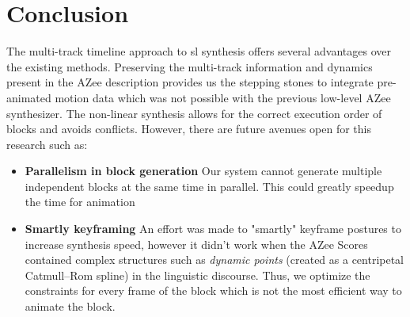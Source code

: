 \documentclass[../../main.tex]{subfiles}
\begin{document}
\section{Conclusion}
\label{ch:multi_track:conclusion}

The multi-track timeline approach to \gls{sl} synthesis offers several advantages over the existing methods. Preserving the multi-track information and dynamics present in the AZee description provides us the stepping stones to integrate pre-animated motion data which was not possible with the previous low-level AZee synthesizer. The non-linear synthesis allows for the correct execution order of blocks and avoids conflicts. However, there are future avenues open for this research such as:

\begin{itemize}
    \item \textbf{Parallelism in block generation} Our system cannot generate multiple independent blocks at the same time in parallel. This could greatly speedup the time for animation
    \item \textbf{Smartly keyframing} An effort was made to "smartly" keyframe postures to increase synthesis speed, however it didn't work when the AZee Scores contained complex structures such as \emph{dynamic points} (created as a centripetal Catmull–Rom spline) in the linguistic discourse. Thus, we optimize the constraints for every frame of the block which is not the most efficient way to animate the block.
\end{itemize}
\end{document}
